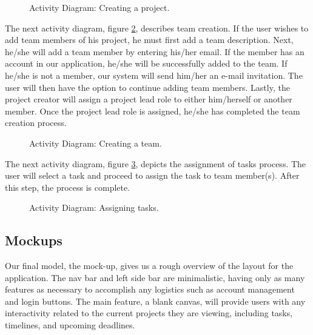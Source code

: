 \begin{figure}[ht]
\centering
{}
\caption{Activity Diagram: Creating a project.}
\label{activityOne}
\end{figure}
\FloatBarrier
\par The next activity diagram, figure \ref{activityTwo}, describes team creation. If the user wishes to add team members of his project, he must first add a team description. Next, he/she will add a team member by entering his/her email. If the member has an account in our application, he/she will be successfully added to the team. If he/she is not a member, our system will send him/her an e-mail invitation. The user will then have the option to continue adding team members. Lastly, the project creator will assign a project lead role to either him/herself or another member. Once the project lead role is assigned, he/she has completed the team creation process. 


\begin{figure}[ht]
\centering
{}
\caption{Activity Diagram: Creating a team.}
\label{activityTwo}
\end{figure}
\FloatBarrier

\par The next activity diagram, figure \ref{activityFour}, depicts the assignment of  tasks process. The user will select a task and proceed to assign the task to team member(s). After this step, the process is complete. 

\begin{figure}[ht]
\centering
{}
\caption{Activity Diagram: Assigning tasks.}
\label{activityFour}
\end{figure}
\FloatBarrier


\subsection{Mockups}

Our final model, the mock-up, gives us a rough overview of the layout for the application. The nav bar and left side bar are minimalistic, having only as many features as necessary to accomplish any logistics such as account management and login buttons. The main feature, a blank canvas, will provide users with any interactivity related to the current projects they are viewing, including tasks, timelines, and upcoming deadlines. 

